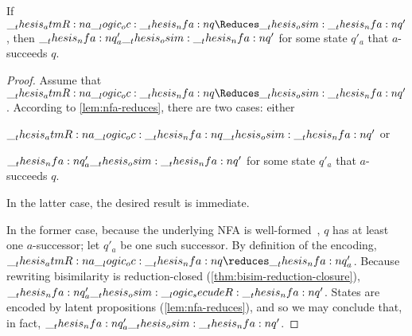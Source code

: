 \begin{lemma}\label{lem:a-succ-bisim}
  If $\atmR{a} \oc \nfa{q} \Reduces\osim \nfa{q}'$, then $\__thesis_nfa:n {q}'_a \__thesis_osim: \__thesis_nfa:n {q}'$ for some state $q'_a$ that $a$-succeeds $q$.
\end{lemma}
\begin{proof}
  Assume that $\atmR{a} \oc \nfa{q} \Reduces\osim \nfa{q}'$.
  According to \cref{lem:nfa-reduces}, there are two cases: either
  \begin{enumerate*}[label=\emph{(\roman*)}]
  \item $\__thesis_atmR:n {a} \__logic_oc: \__thesis_nfa:n {q} \__thesis_osim: \__thesis_nfa:n {q}'$ or
  \item $\__thesis_nfa:n {q}'_a \__thesis_osim: \__thesis_nfa:n {q}'$ for some state $q'_a$ that $a$-succeeds $q$.
  \end{enumerate*}
  In the latter case, the desired result is immediate.

  In the former case, because the underlying \ac{NFA} is well-formed~, $q$ has at least one $a$-successor;
  let $q'_a$ be one such successor.
  By definition of the encoding, $\atmR{a} \oc \nfa{q} \reduces \nfa{q}'_a$.
  Because rewriting bisimilarity is reduction-closed (\cref{thm:bisim-reduction-closure}), $\__thesis_nfa:n {q}'_a \__thesis_osim:\__logic_secudeR: \__thesis_nfa:n {q}'$.
  States are encoded by latent\autocite{??} propositions (\cref{lem:nfa-reduces}), and so we may conclude that, in fact, $\__thesis_nfa:n {q}'_a \__thesis_osim: \__thesis_nfa:n {q}'$.
\end{proof}
